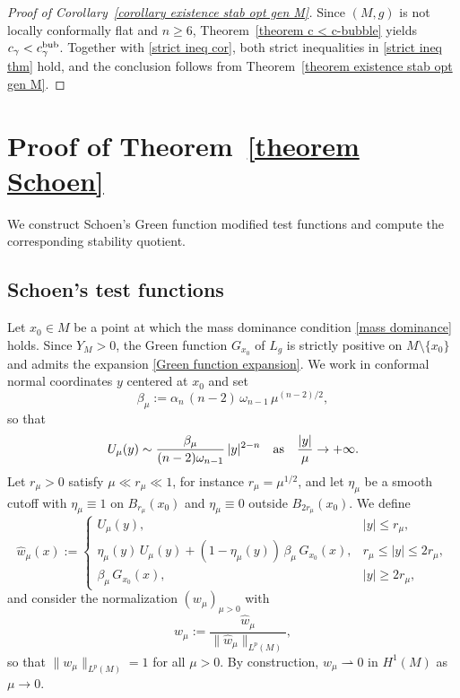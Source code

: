 \documentclass[reqno,11pt]{amsart}
\numberwithin{equation}{section}
\theoremstyle{definition}
\theoremstyle{remark}
\begin{document}
\begin{proof}[Proof of Corollary~\ref{corollary existence stab opt gen M}]
Since $(M,g)$ is not locally conformally flat and $n \geqslant 6$, Theorem~\ref{theorem c < c-bubble} yields $c_\gamma < c_\gamma^{\rm bub}$. Together with \eqref{strict ineq cor}, both strict inequalities in \eqref{strict ineq thm} hold, and the conclusion follows from Theorem~\ref{theorem existence stab opt gen M}.
\end{proof}


\section{Proof of Theorem~\ref{theorem Schoen}}\label{sec:proof-schoen}

We construct Schoen's Green function modified test functions and compute the corresponding stability quotient.

\subsection{Schoen's test functions}
Let $x_0 \in M$ be a point at which the mass dominance condition \eqref{mass dominance} holds. 
Since $Y_M > 0$, the Green function $G_{x_0}$ of $L_g$ is strictly positive on 
$M \setminus \{x_0\}$ and admits the expansion \eqref{Green function expansion}. We work in 
conformal normal coordinates $y$ centered at $x_0$ and set
\[
\beta_\mu := \alpha_n\, (n-2)\, \omega_{n-1}\, \mu^{(n-2)/2},
\]
so that 
\[
U_\mu(y) \sim \frac{\beta_\mu}{(n-2)\omega_{n-1}}\, |y|^{2-n} \quad {\rm as} \quad 
\frac{|y|}{\mu} \to +\infty.
\]
Let $r_\mu>0$ satisfy $\mu \ll r_\mu \ll 1$, for instance $r_\mu = \mu^{1/2}$, and let $\eta_\mu$ 
be a smooth cutoff with $\eta_\mu \equiv 1$ on $B_{r_\mu}(x_0)$ and $\eta_\mu \equiv 0$ 
outside $B_{2r_\mu}(x_0)$. We define
\[
\hat{w}_\mu(x) :=
\begin{cases}
U_\mu(y), & |y| \leqslant r_\mu, \\[3pt]
\eta_\mu(y)\, U_\mu(y) + (1 - \eta_\mu(y))\, \beta_\mu\, G_{x_0}(x), & r_\mu
\leqslant |y| \leqslant 2 r_\mu, \\[3pt]
\beta_\mu\, G_{x_0}(x), & |y| \geqslant 2 r_\mu,
\end{cases}
\]
and consider the normalization $(w_\mu)_{\mu>0}$ with
\begin{equation}\label{eq:schoen_family}
 w_\mu := \frac{\hat{w}_\mu}{\|\hat{w}_\mu\|_{L^p(M)}},
\end{equation}
so that $\|w_\mu\|_{L^p(M)} = 1$ for all $\mu > 0$. By construction,
$w_\mu \rightharpoonup 0$ in $H^1(M)$ as $\mu \to 0$.
\end{document}
